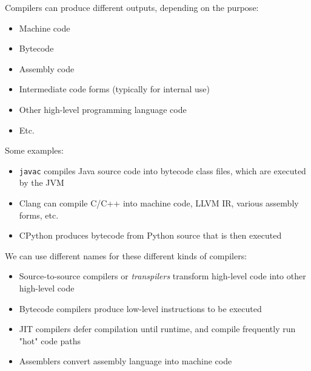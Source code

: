 \documentclass[../index.tex]{subfiles}
\begin{document}
\begin{frame}[fragile]{\currenttitle}
  Compilers can produce different outputs, depending on the purpose:

  \begin{itemize}
    \item<+-> Machine code
    \item<+-> Bytecode
    \item<+-> Assembly code
    \item<+-> Intermediate code forms (typically for internal use)
    \item<+-> Other high-level programming language code
    \item<+-> Etc.
  \end{itemize}
\end{frame}

\begin{frame}[fragile]{\currenttitle}
  Some examples:

  \begin{itemize}
    \item<+-> \texttt{javac} compiles Java source code into bytecode class
      files, which are executed by the JVM
    \item<+-> Clang can compile C/C++ into machine code, LLVM IR,
      various assembly forms, etc.
    \item<+-> CPython produces bytecode from Python source that is then
      executed
  \end{itemize}
\end{frame}

\begin{frame}[fragile]{\currenttitle}
  We can use different names for these different kinds of compilers:

  \begin{itemize}
    \item<+-> Source-to-source compilers or \textit{transpilers} transform
      high-level code into other high-level code
    \item<+-> Bytecode compilers produce low-level instructions to be executed
    \item<+-> JIT compilers defer compilation until runtime, and compile
      frequently run "hot" code paths
    \item<+-> Assemblers convert assembly language into machine code
  \end{itemize}
\end{frame}
\end{document}
